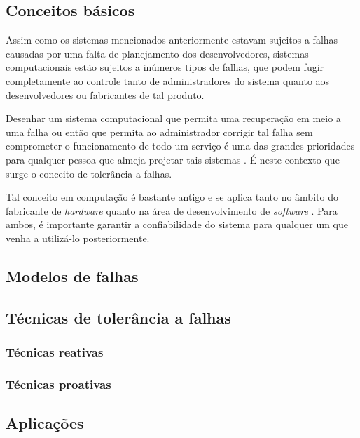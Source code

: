 \documentclass[
	12pt,				%
	openright,			%
	twoside,			%
	a4paper,			%
	english,			%
	french,				%
	spanish,			%
	brazil				%
	]{abntex2}
\begin{document}
\subsection{Conceitos básicos}

Assim como os sistemas mencionados anteriormente estavam sujeitos a falhas causadas por uma falta de planejamento dos desenvolvedores, sistemas computacionais estão sujeitos a inúmeros tipos de falhas, que podem fugir completamente ao controle tanto de administradores do sistema quanto aos desenvolvedores ou fabricantes de tal produto.

Desenhar um sistema computacional que permita uma recuperação em meio a uma falha ou então que permita ao administrador corrigir tal falha sem comprometer o funcionamento de todo um serviço é uma das grandes prioridades para qualquer pessoa que almeja projetar tais sistemas \cite{bala2012fault}. É neste contexto que surge o conceito de tolerância a falhas.

Tal conceito em computação é bastante antigo e se aplica tanto no âmbito do fabricante de \emph{hardware} quanto na área de desenvolvimento de \emph{software} \cite{randell1975system}. Para ambos, é importante garantir a confiabilidade do sistema para qualquer um que venha a utilizá-lo posteriormente.


\subsection{Modelos de falhas}



\subsection{Técnicas de tolerância a falhas}



\subsubsection{Técnicas reativas}



\subsubsection{Técnicas proativas}




\subsection{Aplicações}
\end{document}

